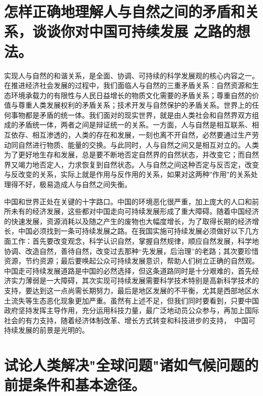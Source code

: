 \documentclass[a4paper]{article}
\begin{document}
\section{怎样正确地理解人与自然之间的矛盾和关系，谈谈你对中国可持续发展 之路的想法。}

实现人与自然的和谐关系，是全面、协调、可持续的科学发展观的核心内容之一。在推进经济社会发展的过程中，我们面临人与自然的三重矛盾关系：自然资源和生态环境承载力的有限性与人民日益增长的物质文化需要的矛盾关系；尊重自然的价值与尊重人类发展权利的矛盾关系；技术开发与自然保护的矛盾关系。世界上的任何事物都是矛盾的统一体。我们面对的现实世界，就是由人类社会和自然界双方组成的矛盾统一体，两者之间是辩证统一的关系。一方面，人与自然是相互联系、相互依存、相互渗透的，人类的存在和发展，一刻也离不开自然，必然要通过生产劳动同自然进行物质、能量的交换。与此同时，人与自然之间又是相互对立的。人类为了更好地生存和发展，总是要不断地否定自然界的自然状态，并改变它；而自然界又竭力地否定人，力求恢复到自然状态。人与自然之间这种否定与反否定，改变与反改变的关系，实际上就是作用与反作用的关系，如果对这两种″作用″的关系处理得不好，极易造成人与自然之间失衡。 

中国和世界正处在关键的十字路口。中国的环境恶化很严重，加上庞大的人口和前所未有的经济发展，这些都对中国走向可持续发展形成了重大障碍。随着中国经济的快速发展，资源消耗以及随之产生的废物也大幅度增长，为了取得长期的经济增长，中国必须找到一条可持续发展之路。在我国实施可持续发展必须做好以下几方面工作：首先要改变观念，科学认识自然，掌握自然规律，顺应自然发展，科学地协调、改造自然，善待自然，改变过去那种“先发展，后治理”的老路；其次要珍惜资源，节约资源；最后要唤起公众可持续发展意识，帮助人们树立正确的自然观。中国走可持续发展道路是中国的必然选择，但这条道路同时是十分艰难的，首先经济实力薄弱是一大障碍，其次实现可持续发展需要科学技术特别是高新科学技术的支持，要达到这一点尚需长期努力，最后是地区发展的不平衡，尤其是西部地区水土流失等生态恶化现象更加严重。虽然有上述不足，但我们同时要看到，只要中国政府坚持发挥主导作用，充分运用科技力量，最广泛地动员公众参与，再加上国际社会的有力支持，随着经济体制改革、增长方式转变和科技进步的支持， 中国可持续发展的前景是光明的。

\section{试论人类解决"全球问题"诸如气候问题的前提条件和基本途径。}
\end{document}
